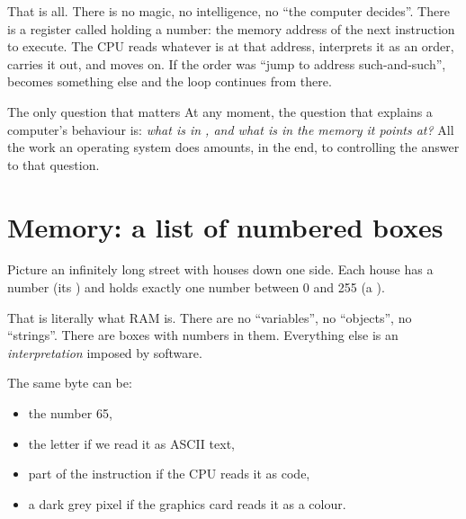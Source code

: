That is all. There is no magic, no intelligence, no ``the computer decides''. There is a register
called  holding a number: the memory address of the next instruction to execute. The CPU
reads whatever is at that address, interprets it as an order, carries it out, and moves on. If the
order was ``jump to address such-and-such'',  becomes something else and the loop
continues from there.

\begin{concept}{The only question that matters}
At any moment, the question that explains a computer's behaviour is: \emph{what is in ,
and what is in the memory it points at?} All the work an operating system does amounts, in the
end, to controlling the answer to that question.
\end{concept}

\section{Memory: a list of numbered boxes}

Picture an infinitely long street with houses down one side. Each house has a number (its
) and holds exactly one number between 0 and 255 (a ).

\begin{center}
\end{center}

That is literally what RAM is. There are no ``variables'', no ``objects'', no ``strings''. There
are boxes with numbers in them. Everything else is an \emph{interpretation} imposed by software.

The same byte  can be:
\begin{itemize}
  \item the number 65,
  \item the letter  if we read it as ASCII text,
  \item part of the instruction  if the CPU reads it as code,
  \item a dark grey pixel if the graphics card reads it as a colour.
\end{itemize}

